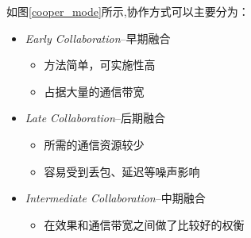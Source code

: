 \documentclass[8]{beamer}
\begin{document}
\begin{frame}
\begin{columns}[t]
        \begin{column}{0.5\linewidth}
        如图\ref{cooper_mode}所示,协作方式可以主要分为：
        \begin{itemize}
            \item \textit{Early Collaboration}--早期融合\cite{chen2019cooper, ITS_early,F-Cooper}
            \begin{itemize}
                \scriptsize
                \item 方法简单，可实施性高
                \item 占据大量的通信带宽
            \end{itemize}
            \item \textit{Late Collaboration}--后期融合
                \begin{itemize}
                    \scriptsize
                    \item 所需的通信资源较少
                    \item 容易受到丢包、延迟等噪声影响
                \end{itemize}
            \item \textit{Intermediate Collaboration}--中期融合\cite{wang2020v2vnet,liu2020who2com,liu2020when2com,li2021learning,hu_where2comm_2022}
            \begin{itemize}
                \scriptsize
                \item 在效果和通信带宽之间做了比较好的权衡
            \end{itemize}
        \end{itemize}
        \end{column}
    \end{columns}
\end{frame}
\end{document}
